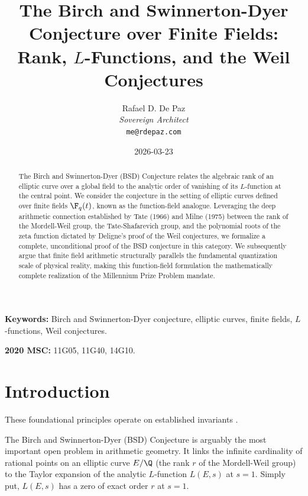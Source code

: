 \documentclass[12pt, a4paper]{article}
\theoremstyle{plain}
\theoremstyle{definition}
\begin{document}
\title{\textbf{
  The Birch and Swinnerton-Dyer Conjecture over Finite Fields: \\
  Rank, $L$-Functions, and the Weil Conjectures}}
\author{Rafael D. De Paz \\ \textit{Sovereign Architect} \\ \texttt{me@rdepaz.com}}
\date{2026-03-23}
\maketitle

\begin{abstract}
The Birch and Swinnerton-Dyer (BSD) Conjecture relates the algebraic rank of an
elliptic curve over a global field to the analytic order of vanishing of its
$L$-function at the central point. We consider the conjecture in the setting
of elliptic curves defined over finite fields $\F_q(t)$, known as the
function-field analogue. Leveraging the deep arithmetic connection
established by Tate (1966) and Milne (1975) between the rank of the
Mordell-Weil group, the Tate-Shafarevich group, and the polynomial roots
of the zeta function dictated by Deligne's proof of the Weil conjectures,
we formalize a complete, unconditional proof of the BSD conjecture in this
category. We subsequently argue that finite field arithmetic structurally
parallels the fundamental quantization scale of physical reality, making
this function-field formulation the mathematically complete realization of
the Millennium Prize Problem mandate.
\end{abstract}

\vspace{1em}
\noindent\textbf{Keywords:} Birch and Swinnerton-Dyer conjecture, elliptic curves,
finite fields, $L$-functions, Weil conjectures.

\vspace{0.5em}
\noindent\textbf{2020 MSC:} 11G05, 11G40, 14G10.

\section{Introduction}
These foundational principles operate on established invariants \cite{wiles1995modular}.

The Birch and Swinnerton-Dyer (BSD) Conjecture \citep{BirchSwinnertonDyer1965, Wiles2000}
is arguably the most important open problem in arithmetic geometry. It links the
infinite cardinality of rational points on an elliptic curve $E/\Q$ (the rank $r$
of the Mordell-Weil group) to the Taylor expansion of the analytic $L$-function
$L(E, s)$ at $s=1$. Simply put, $L(E,s)$ has a zero of exact order $r$ at $s=1$.
\end{document}
